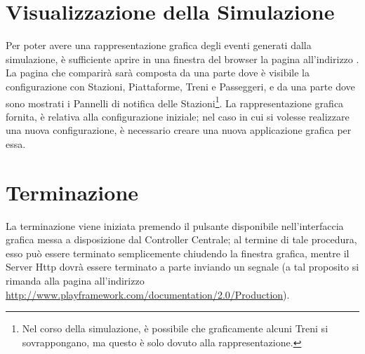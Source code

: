 	\section{Visualizzazione della Simulazione}
	
	Per poter avere una rappresentazione grafica degli eventi generati dalla simulazione, è sufficiente aprire in una finestra del browser  la pagina all'indirizzo . La pagina che comparirà sarà composta da una parte dove è visibile la configurazione con Stazioni, Piattaforme, Treni e Passeggeri, e da una parte dove sono mostrati i Pannelli di notifica delle Stazioni\footnote{Nel corso della simulazione, è possibile che graficamente alcuni Treni si sovrappongano, ma questo è solo dovuto alla rappresentazione.}.
	La rappresentazione grafica fornita, è relativa alla configurazione iniziale; nel caso in cui si volesse realizzare una nuova configurazione, è necessario creare una nuova applicazione grafica per essa.
	
	\section{Terminazione}
	
	La terminazione viene iniziata premendo il pulsante  disponibile nell'interfaccia grafica messa a disposizione dal Controller Centrale; al termine di tale procedura, esso può essere terminato semplicemente chiudendo la finestra grafica, mentre il Server Http dovrà essere terminato a parte inviando un segnale  (a tal proposito si rimanda alla pagina all'indirizzo \url{http://www.playframework.com/documentation/2.0/Production}).
